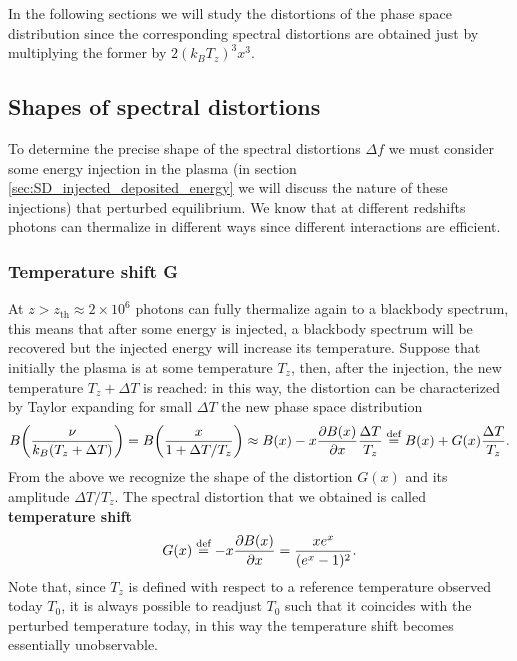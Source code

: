 In the following sections we will study the distortions of the phase space distribution since the corresponding spectral distortions are obtained just by multiplying the former by $2(k_BT_z)^3x^3$.
\subsection{Shapes of spectral distortions}\label{sec:SD_shapes}
To determine the precise shape of the spectral distortions $\Delta f$ we must consider some energy injection in the plasma (in section \ref{sec:SD_injected_deposited_energy} we will discuss the nature of these injections) that perturbed equilibrium. We know that at different redshifts photons can thermalize in different ways since different interactions are efficient. 
\subsubsection{Temperature shift G}
At $z>z_\text{th}\approx2\times10^6$ photons can fully thermalize again to a blackbody spectrum, this means that after some energy is injected, a blackbody spectrum will be recovered but the injected energy will increase its temperature. Suppose that initially the plasma is at some temperature $T_z$, then, after the injection, the new temperature $T_z+\Delta T$ is reached: in this way, the distortion can be characterized by Taylor expanding for small $\Delta T$ the new phase space distribution 
$$B\bigg(\frac{\nu}{k_B(T_z+\Delta T)}\bigg)=B\bigg(\frac{x}{1+\Delta T/T_z}\bigg)\approx B(x)-x\frac{\partial B(x)}{\partial x}\frac{\Delta T}{T_z}\stackrel{\text{def}}{=} B(x)+G(x)\frac{\Delta T}{T_z}.$$
From the above we recognize the shape of the distortion $G(x)$ and its amplitude $\Delta T/T_z$. The spectral distortion that we obtained is called \textbf{temperature shift}
\begin{equation}
    \label{eq:SD_temperature_shift}
    G(x)\stackrel{\text{def}}{=}-x\frac{\partial B(x)}{\partial x}=\frac{xe^x}{(e^x-1)^2}.
\end{equation}
Note that, since $T_z$ is defined with respect to a reference temperature observed today $T_0$, it is always possible to readjust $T_0$ such that it coincides with the perturbed temperature today, in this way the temperature shift becomes essentially unobservable. 
